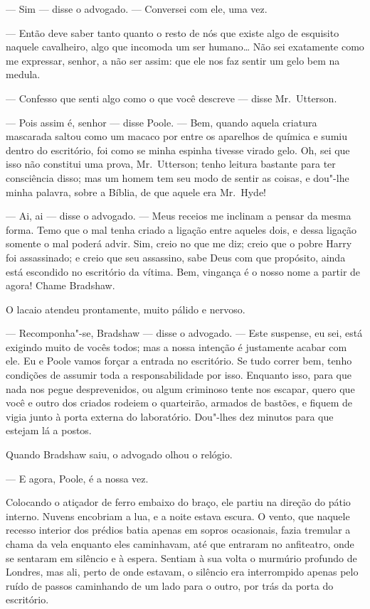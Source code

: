 --- Sim --- disse o advogado. --- Conversei com ele, uma vez.

--- Então deve saber tanto quanto o resto de nós que existe algo de
esquisito naquele cavalheiro, algo que incomoda um ser humano\ldots{}  Não
sei exatamente como me expressar, senhor, a não ser assim: que ele nos
faz sentir um gelo bem na medula.

--- Confesso que senti algo como o que você descreve --- disse Mr.~Utterson.

--- Pois assim é, senhor --- disse Poole. --- Bem, quando aquela criatura
mascarada saltou como um macaco por entre os aparelhos de química e
sumiu dentro do escritório, foi como se minha espinha tivesse virado
gelo.  Oh, sei que isso não constitui uma prova, Mr.~Utterson; tenho
leitura bastante para ter consciência disso; mas um homem tem seu modo
de sentir as coisas, e dou"-lhe minha palavra, sobre a Bíblia, de que
aquele era Mr.~Hyde!

--- Ai, ai --- disse o advogado. --- Meus receios me inclinam a pensar da
mesma forma. Temo que o mal tenha criado a ligação entre aqueles dois,
e dessa ligação somente o mal poderá advir.  Sim, creio no que me diz;
creio que o pobre Harry foi assassinado; e creio que seu assassino,
sabe Deus com que propósito, ainda está escondido no escritório da
vítima.  Bem, vingança é o nosso nome a partir de agora!  Chame
Bradshaw.

O lacaio atendeu prontamente, muito pálido e nervoso.

--- Recomponha"-se, Bradshaw --- disse o advogado. --- Este suspense, eu sei,
está exigindo muito de vocês todos; mas a nossa intenção é justamente
acabar com ele.  Eu e Poole vamos forçar a entrada no escritório.  Se
tudo correr bem, tenho condições de assumir toda a responsabilidade por
isso.  Enquanto isso, para que nada nos pegue desprevenidos, ou algum
criminoso tente nos escapar, quero que você e outro dos criados rodeiem
o quarteirão, armados de bastões, e fiquem de vigia junto à porta
externa do laboratório.  Dou"-lhes dez minutos para que estejam lá a
postos.

Quando Bradshaw saiu, o advogado olhou o relógio.

--- E agora, Poole, é a nossa vez.

Colocando o atiçador de ferro embaixo do braço, ele partiu na direção do
pátio interno.  Nuvens encobriam a lua, e a noite estava escura.  O
vento, que naquele recesso interior dos prédios batia apenas em sopros
ocasionais, fazia tremular a chama da vela enquanto eles caminhavam,
até que entraram no anfiteatro, onde se sentaram em silêncio e à
espera.  Sentiam à sua volta o murmúrio profundo de Londres, mas ali,
perto de onde estavam, o silêncio era interrompido apenas pelo ruído de
passos caminhando de um lado para o outro, por trás da porta do
escritório.

